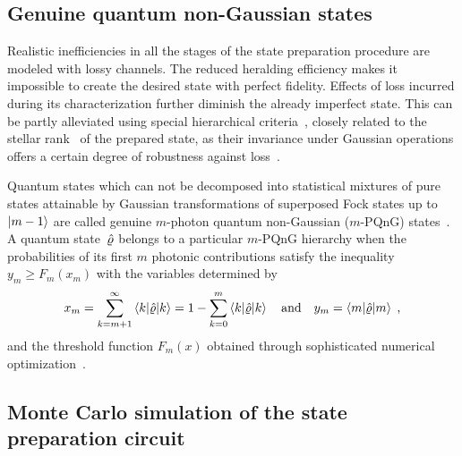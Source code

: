 \documentclass{article}
\begin{document}
%

%
%

\subsection*{Genuine quantum non-Gaussian states}

Realistic inefficiencies in all the stages of the state preparation procedure are modeled with lossy channels. The reduced heralding efficiency makes it impossible to create the desired state with perfect fidelity. Effects of loss incurred during its characterization further diminish the already imperfect state. This can be partly alleviated using special hierarchical criteria~\cite{lachman2019}, closely related to the stellar rank~\cite{chabaud2020,walschaers2021,fiurasek2022} of the prepared state, as their invariance under Gaussian operations offers a certain degree of robustness against loss~\cite{lachman2019}.

Quantum states which can not be decomposed into statistical mixtures of pure states attainable by Gaussian transformations of superposed Fock states up to ${\ket{m - 1}}$ are called genuine $m$-photon quantum non-Gaussian ($m$-PQnG) states~\cite{lachman2019}. 
%
A quantum state~$\hat{\varrho}$ belongs to a particular $m$-PQnG hierarchy when the probabilities of its first $m$ photonic contributions
satisfy the inequality~${y_{m} \geq F_{m} (x_{m})}$ with the variables determined by
%
\begin{equation}
  x_{m} 
    = \sum_{k = m + 1}^{\infty} 
      \braket{k | \hat{\varrho} | k}
    = 1 - \sum_{k = 0}^{m} 
      \braket{k | \hat{\varrho} | k}
  \quad\text{and}\quad
  y_{m} = \braket{m | \hat{\varrho} | m}
  \;\text{,}
\end{equation}
%
and the threshold function $F_{m}(x)$ obtained through sophisticated numerical optimization~\cite{lachman2019,fiurasek2022}.

%
%

\subsection*{Monte Carlo simulation of the state preparation circuit}
\end{document}
